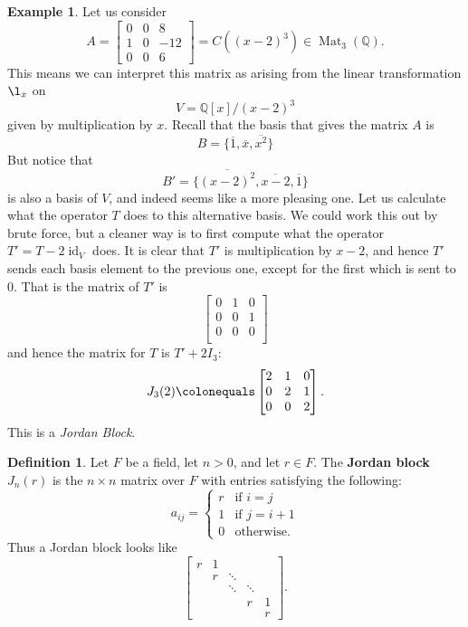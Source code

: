 \documentclass[12pt]{report}
\numberwithin{equation}{section}
\numberwithin{theorem}{chapter}
\theoremstyle{definition}
\newtheorem{definition}[theorem]{Definition}
\newtheorem{example}[theorem]{Example}
\newtheorem*{basic properties}{Basic Properties}
\newtheorem*{Important Remark}{Important Remark}
\newcommand{\df}[1]{{\bf #1}\index{#1}}
\newcommand{\Q}{\mathbb{Q}}
\DeclareMathOperator{\id}{id}
\DeclareMathOperator{\M}{Mat}
\begin{document}
\begin{example}\label{example JCF}
Let us consider
$$A =
\begin{bmatrix}
0 & 0 & 8 \\
1 & 0 & -12 \\
0 & 0 & 6 
\end{bmatrix}=C((x-2)^3)\in \M_3(\Q).$$
 This means we can interpret this matrix as arising from the linear transformation $\l_x$ on 
$$V = \Q[x]/(x-2)^3$$
given by multiplication by $x$. Recall that the basis that gives the matrix $A$ is
$$B=\{\overline{1}, \overline{x}, \overline{x^2}\}$$
But notice that 
$$B' = \{\overline{(x-2)^2}, \overline{x-2}, \overline{1}\}$$
is also a basis of $V$, and indeed seems like a more pleasing one. 
Let us calculate what the operator $T$ does to this alternative basis. We could work this out by brute force, but a cleaner way is to first compute what the operator $T' = T -2 \id_V$ does. It is clear that $T'$ is multiplication by $x-2$, and hence $T'$ sends each basis element to the previous one, except for the first which is sent to $0$. That is the matrix of $T'$ is
$$\begin{bmatrix}
0 & 1 & 0 \\
0 & 0 & 1 \\
0 & 0 & 0 \\
\end{bmatrix}$$
and hence the matrix for $T$ is $T' + 2 I_3$:
$$J_3(2) \colonequals 
\begin{bmatrix}
2 & 1 & 0 \\
0 & 2 & 1 \\
0 & 0 & 2 \\
\end{bmatrix}.$$
This is a \emph{Jordan Block}. 
\end{example}

\begin{definition}
Let $F$ be a field, let $n > 0$, and let $r \in F$. The \df{Jordan block} $J_n(r)$ is the $n \times n$ matrix over $F$ with entries satisfying the following:
$$a_{ij} = \begin{cases} 
r & \textrm{if } i=j \\ 
1 & \textrm{if } j=i+1 \\
0 & \textrm{otherwise}.
\end{cases}
$$
Thus a Jordan block looks like
$$\begin{bmatrix}
r & 1 &  \\
& r & \ddots \\
& & \ddots & \ddots\\
& & & r & 1\\
&&&& r	
\end{bmatrix}.
$$
\end{definition}
\end{document}
